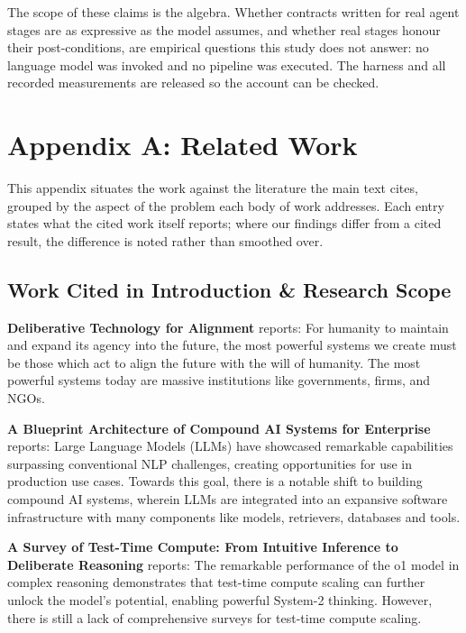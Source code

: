 \documentclass[10pt,journal,compsoc,twocolumn]{IEEEtran}
\begin{document}
The scope of these claims is the algebra. Whether contracts written for real agent stages are as expressive as the model assumes, and whether real stages honour their post-conditions, are empirical questions this study does not answer: no language model was invoked and no pipeline was executed. The harness and all recorded measurements are released so the account can be checked.






\section{Appendix A: Related Work}


This appendix situates the work against the literature the main text cites, grouped by the aspect of the problem each body of work addresses. Each entry states what the cited work itself reports; where our findings differ from a cited result, the difference is noted rather than smoothed over.


\subsection{Work Cited in Introduction \& Research Scope}


\textbf{Deliberative Technology for Alignment} \cite{arxiv_2312_03893} reports: For humanity to maintain and expand its agency into the future, the most powerful systems we create must be those which act to align the future with the will of humanity. The most powerful systems today are massive institutions like governments, firms, and NGOs.

\textbf{A Blueprint Architecture of Compound AI Systems for Enterprise} \cite{arxiv_2406_00584} reports: Large Language Models (LLMs) have showcased remarkable capabilities surpassing conventional NLP challenges, creating opportunities for use in production use cases. Towards this goal, there is a notable shift to building compound AI systems, wherein LLMs are integrated into an expansive software infrastructure with many components like models, retrievers, databases and tools.

\textbf{A Survey of Test-Time Compute: From Intuitive Inference to Deliberate Reasoning} \cite{arxiv_2501_02497} reports: The remarkable performance of the o1 model in complex reasoning demonstrates that test-time compute scaling can further unlock the model's potential, enabling powerful System-2 thinking. However, there is still a lack of comprehensive surveys for test-time compute scaling.
\end{document}
